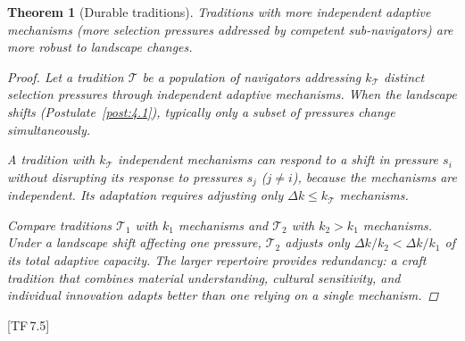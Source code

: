 \documentclass[10pt]{article}
\theoremstyle{definition}
\theoremstyle{plain}
\newtheorem{theorem}[definition]{Theorem}
\theoremstyle{remark}
\newcommand{\TF}[1]{\textnormal{[TF\,#1]}}  %
\begin{document}
\begin{theorem}[Durable traditions]\label{thm:10.2}
Traditions with more independent adaptive mechanisms (more selection
pressures addressed by competent sub-navigators) are more robust to
landscape changes.

\begin{proof}
Let a tradition $\mathcal{T}$ be a population of navigators addressing
$k_\mathcal{T}$ distinct selection pressures through independent adaptive
mechanisms. When the landscape shifts (Postulate~\ref{post:4.1}),
typically only a subset of pressures change simultaneously.

A tradition with $k_\mathcal{T}$ independent mechanisms can respond to
a shift in pressure $s_i$ without disrupting its response to pressures
$s_j$ ($j \neq i$), because the mechanisms are independent. Its
adaptation requires adjusting only $\Delta k \leq k_\mathcal{T}$
mechanisms.

Compare traditions $\mathcal{T}_1$ with $k_1$ mechanisms and
$\mathcal{T}_2$ with $k_2 > k_1$ mechanisms. Under a landscape shift
affecting one pressure, $\mathcal{T}_2$ adjusts only
$\Delta k / k_2 < \Delta k / k_1$ of its total adaptive capacity.
The larger repertoire provides redundancy: a craft tradition that
combines material understanding, cultural sensitivity, and individual
innovation adapts better than one relying on a single mechanism.
\qedhere
\end{proof}
\end{theorem}

\TF{7.5}
\end{document}
